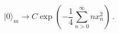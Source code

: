 \begin{equation}
| 0 \rangle_m \rightarrow
C \exp \left( -\frac{1}{ 4}\sum_{n > 0}^{ \infty} 
nx_n^2 \right)\,.
\end{equation}


